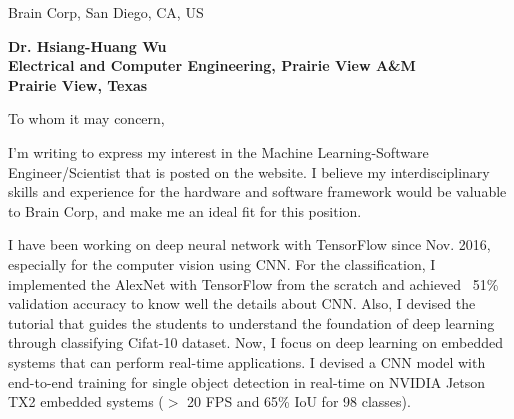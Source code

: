 \documentclass[12pt]{letter} %
\newcounter{comment}
\begin{document}

\begin{letter}{Brain Corp, San Diego, CA, US} 


\begin{center}
\large\bf Dr. Hsiang-Huang Wu\\ %
Electrical and Computer Engineering, Prairie View A\&M \\ 
Prairie View, Texas %
\end{center} 
\vfill

\signature{Hsiang-Huang Wu} %


\opening{To whom it may concern,} 

I'm writing to express my interest in the Machine Learning-Software Engineer/Scientist that is posted on the website.
I believe my interdisciplinary skills and experience for the hardware and software framework would be valuable to 
Brain Corp, and make me an ideal fit for this position.

I have been working on deep neural network with TensorFlow since Nov. 2016, especially for
the computer vision using CNN.  For the classification, I implemented the AlexNet with TensorFlow from the scratch
and achieved ~51\% validation accuracy to know well the details about CNN.  Also, I devised the tutorial that
guides the students to understand the foundation of deep learning through classifying Cifat-10 dataset.
Now, I focus on deep learning on embedded systems that can perform real-time applications.
I devised a CNN model with end-to-end training for single object detection in real-time on NVIDIA
Jetson TX2 embedded systems ($>$ 20 FPS and 65\% IoU for 98 classes).


\end{letter}
\end{document}
